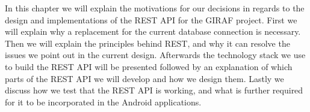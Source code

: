 In this chapter we will explain the motivations for our decisions in regards to the design and implementations of the REST API for the GIRAF project.
First we will explain why a replacement for the current database connection is necessary.
Then we will explain the principles behind REST, and why it can resolve the issues we point out in the current design.
Afterwards the technology stack we use to build the REST API will be presented followed by an explanation of which parts of the REST API we will develop and how we design them.
Lastly we discuss how we test that the REST API is working, and what is further required for it to be incorporated in the Android applications.